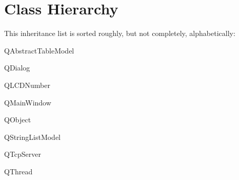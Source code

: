 \section{Class Hierarchy}
This inheritance list is sorted roughly, but not completely, alphabetically\+:\begin{DoxyCompactList}
\item {}
\item Q\+Abstract\+Table\+Model\begin{DoxyCompactList}
\item {}
\end{DoxyCompactList}
\item Q\+Dialog\begin{DoxyCompactList}
\item {}
\end{DoxyCompactList}
\item Q\+L\+C\+D\+Number\begin{DoxyCompactList}
\item {}
\end{DoxyCompactList}
\item Q\+Main\+Window\begin{DoxyCompactList}
\item {}
\end{DoxyCompactList}
\item Q\+Object\begin{DoxyCompactList}
\item {}
\item {}
\end{DoxyCompactList}
\item Q\+String\+List\+Model\begin{DoxyCompactList}
\item {}
\end{DoxyCompactList}
\item Q\+Tcp\+Server\begin{DoxyCompactList}
\item {}
\end{DoxyCompactList}
\item Q\+Thread\begin{DoxyCompactList}
\item {}
\end{DoxyCompactList}
\item {}
\end{DoxyCompactList}
